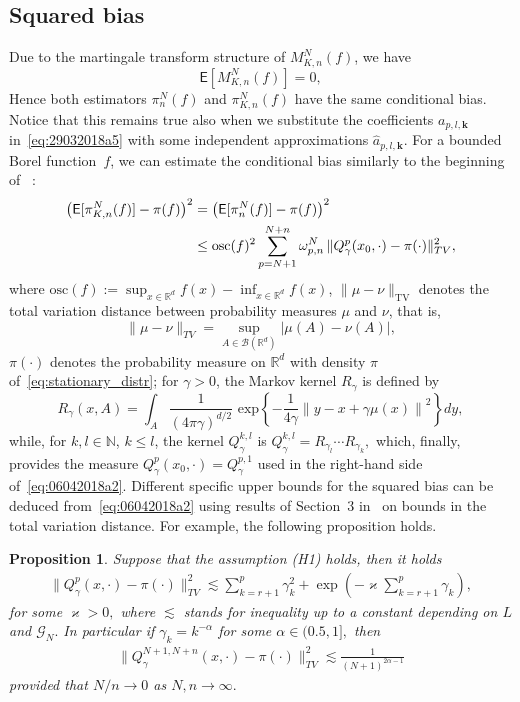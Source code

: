 \documentclass[bj]{imsart}
\newtheorem{prop}[thm]{Proposition}
\def\TV{\operatorname{TV}}
\begin{document}
\subsection{Squared bias}
Due to the martingale transform structure
of $M_{K,n}^N(f)$,
we have
\[
\mathsf E\left[M_{K,n}^N(f)\right]=0,
\]
Hence both estimators
$\pi_n^N(f)$ and $\pi_{K,n}^N(f)$ have the same conditional bias.
Notice that this remains true also when we substitute
the coefficients $a_{p,l,\mathbf{k}}$ in~\eqref{eq:29032018a5}
with some independent approximations $\widehat a_{p,l,\mathbf{k}}.$ For a bounded Borel function~$f$,
we can estimate the conditional bias
similarly to the beginning of ~\cite[Section~4]{durmus:moulines:2017}:
\begin{align}
\left(\mathsf{E}[\pi_{K,n}^N(f)]-\pi(f)\right)^2
&=\left(\mathsf{E}[\pi_{n}^N(f)]-\pi(f)\right)^2
\label{eq:06042018a2}\\
&\le
\mathrm{osc}(f)^2
\sum_{p=N+1}^{N+n}
\omega_{p,n}^N\,
\|Q_\gamma^{p}(x_0,\cdot)-\pi(\cdot)\|_{TV}^2,
\notag
\end{align}
where
$\mathrm{osc}(f):=\sup_{x\in\mathbb R^d}f(x)-\inf_{x\in\mathbb R^d}f(x)$,
$\|\mu-\nu\|_{\TV}$ denotes the total variation distance
between probability measures $\mu$ and $\nu$, that is,
$$
\|\mu-\nu\|_{TV}=\sup_{A\in\mathcal B(\mathbb R^d)}
|\mu(A)-\nu(A)|,
$$
$\pi(\cdot)$ denotes the probability measure on $\mathbb R^d$
with density $\pi$ of~\eqref{eq:stationary_distr};
for $\gamma>0$, the Markov kernel $R_\gamma$
is defined by
$$
R_\gamma(x,A)=\int_{A} \frac{1}{(4 \pi \gamma)^{d/2}} \text{ exp} \left\{ -\frac{1}{4\gamma} \left\| y - x + \gamma \mu(x)\right\|^2\right\}dy,
$$
while, for $k,l\in\mathbb N$, $k\le l$,
the kernel $Q_\gamma^{k,l}$ is
$
Q_\gamma^{k,l}=R_{\gamma_l}\cdots R_{\gamma_k},
$
which, finally, provides the  measure
$Q_\gamma^{p}(x_0,\cdot)=Q_\gamma^{p,1}$
used in the right-hand side of~\eqref{eq:06042018a2}.
Different specific upper bounds for the squared bias
can be deduced from~\eqref{eq:06042018a2}
using results of Section~3 in~\cite{durmus:moulines:2017}
on bounds in the total variation distance. For example, the following proposition holds.
\begin{prop}
Suppose that the assumption (H1) holds, then it holds
\begin{eqnarray*}
\|Q_\gamma^{p}(x,\cdot)-\pi(\cdot)\|^2_{TV}\lesssim \sum_{k=r+1}^{p} \gamma_k^2+\exp\left(-\varkappa\sum_{k=r+1}^{p} \gamma_k\right),
\end{eqnarray*}
for some $\varkappa>0,$ where $\lesssim$ stands for  inequality up to a constant depending on $L$ and $\mathcal G_N.$ In particular if $\gamma_k=k^{-\alpha}$ for some $\alpha\in (0.5,1], $ then 
\begin{eqnarray*}
\|Q_\gamma^{N+1,N+n}(x,\cdot)-\pi(\cdot)\|^2_{TV}\lesssim \frac{1}{(N+1)^{2\alpha-1}}
\end{eqnarray*}
provided that $N/n\to 0$ as $N,n\to \infty.$
\end{prop}
\end{document}
